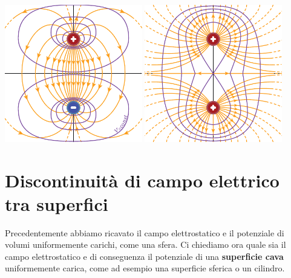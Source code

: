 \begin{examples}
\begin{itemize}
		\begin{center}
			\includegraphics[width=0.45\textwidth]{images/chp3/chp3potcampodipolo1.pdf}\hspace{20pt}
			\includegraphics[width=0.45\textwidth]{images/chp3/chp3potcampodipolo2.pdf}
		\end{center}
	\end{itemize}
\end{examples}
\section{Discontinuità di campo elettrico tra superfici}
Precedentemente abbiamo ricavato il campo elettrostatico e il potenziale di volumi uniformemente carichi, come una sfera. Ci chiediamo ora quale sia il campo elettrostatico e di conseguenza il potenziale di una \textbf{superficie cava} uniformemente carica, come ad esempio una superficie sferica o un cilindro.
